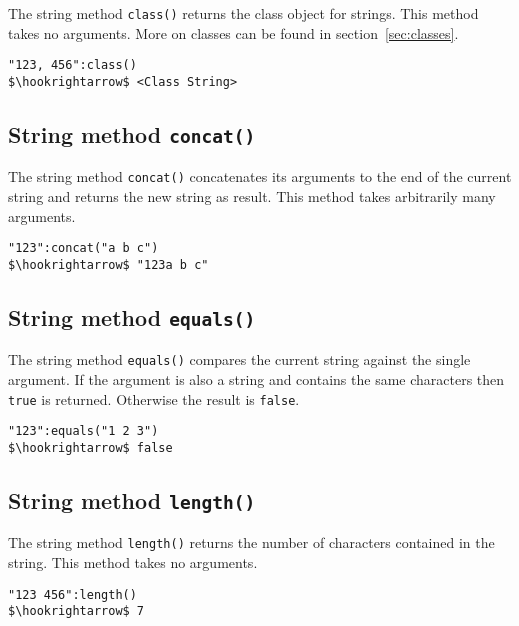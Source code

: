 \documentclass[11pt,a4paper]{scrbook}
\newcommand\keyword[1]{\texttt{#1}}
\newcommand\method[1]{\texttt{#1}}
\begin{document}
The string method \method{class()} returns the class object for strings. This
method takes no arguments. More on classes can be found in
section~\ref{sec:classes}.

\begin{lstlisting}[language=BibTool,mathescape=true]
"123, 456":class()
$\hookrightarrow$ <Class String>
\end{lstlisting}

\subsection{String method \method{concat()}}

The string method \method{concat()} concatenates its arguments to the end of
the current string and returns the new string as result.
This method takes arbitrarily many arguments.

\begin{lstlisting}[language=BibTool,mathescape=true]
"123":concat("a b c")
$\hookrightarrow$ "123a b c"
\end{lstlisting}

\subsection{String method \method{equals()}}

The string method \method{equals()} compares the current string against the
single argument. If the argument is also a string and contains the same
characters then \keyword{true} is returned. Otherwise the result is
\keyword{false}.

\begin{lstlisting}[language=BibTool,mathescape=true]
"123":equals("1 2 3")
$\hookrightarrow$ false
\end{lstlisting}

\subsection{String method \method{length()}}

The string method \method{length()} returns the number of characters contained
in the string. This method takes no arguments.

\begin{lstlisting}[language=BibTool,mathescape=true]
"123 456":length()
$\hookrightarrow$ 7
\end{lstlisting}

\end{document}
